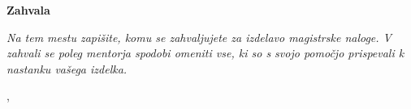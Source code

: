 \thispagestyle{empty}

\begin{center}
{\Large \textbf{\sc Zahvala}}
\end{center}
\vspace{0.5cm}

{\it\noindent
Na tem mestu zapišite, komu se zahvaljujete za izdelavo magistrske naloge. V zahvali se poleg mentorja spodobi omeniti vse, ki so s svojo pomočjo prispevali k nastanku vašega izdelka.


\vspace{0.5cm} \hfill \tauthor, \myyear
}